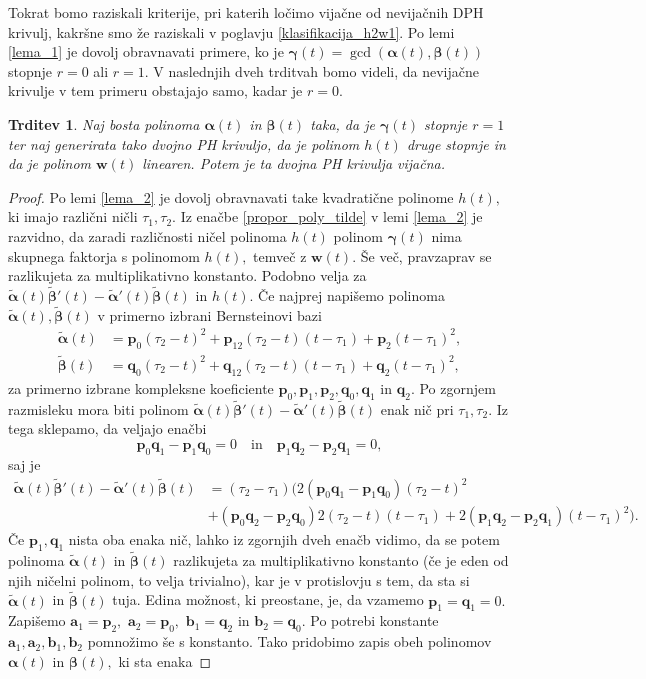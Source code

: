 \documentclass[12pt,a4paper,twoside]{article}
\theoremstyle{definition} %
\theoremstyle{plain} %
\newtheorem{trditev}[definicija]{Trditev}
\numberwithin{equation}{section}  %
\newcommand{\aV}{\mathbf{a}}
\newcommand{\bV}{\mathbf{b}}
\newcommand{\pV}{\mathbf{p}}
\newcommand{\qV}{\mathbf{q}}
\newcommand{\wV}{\mathbf{w}}
\newcommand{\balpha}{\boldsymbol \alpha}
\newcommand{\bbeta}{\boldsymbol \beta}
\newcommand{\bgamma}{\boldsymbol \gamma}
\newcommand{\btalpha}{\tilde{\boldsymbol \alpha}}
\newcommand{\btbeta}{\tilde{\boldsymbol \beta}}
\begin{document}
Tokrat bomo raziskali kriterije, pri katerih ločimo vijačne od nevijačnih DPH krivulj, kakršne smo že raziskali v poglavju \ref{klasifikacija_h2w1}. Po lemi \ref{lema_1} je dovolj obravnavati primere, ko je $\bgamma(t)=\gcd(\balpha(t),\bbeta(t))$ stopnje $r=0$ ali $r=1.$ V naslednjih dveh trditvah bomo videli, da nevijačne krivulje v tem primeru obstajajo samo, kadar je $r=0.$
\begin{trditev}
	Naj bosta polinoma $\balpha(t)$ in $\bbeta(t)$ taka, da je $\bgamma(t)$ stopnje $r=1$ ter naj generirata tako dvojno PH krivuljo, da je polinom $h(t)$ druge stopnje in da je polinom $\wV(t)$ linearen. Potem je ta dvojna PH krivulja vijačna.
\end{trditev}
\begin{proof}
	Po lemi \ref{lema_2} je dovolj obravnavati take kvadratične polinome $h(t),$ ki imajo različni ničli $\tau_1,\tau_2.$ Iz enačbe \eqref{propor_poly_tilde} v lemi \ref{lema_2} je razvidno, da zaradi različnosti ničel polinoma $h(t)$ polinom $\bgamma(t)$ nima skupnega faktorja s polinomom $h(t),$ temveč z $\wV(t).$ Še več, pravzaprav se razlikujeta za multiplikativno konstanto. Podobno velja za $\btalpha(t)\btbeta'(t)-\btalpha'(t)\btbeta(t)$ in $h(t).$ Če najprej napišemo polinoma $\btalpha(t),\btbeta(t)$ v primerno izbrani Bernsteinovi bazi
	\begin{align*}
		\btalpha(t)&=\pV_0(\tau_2-t)^2+\pV_12(\tau_2-t)(t-\tau_1)+\pV_2(t-\tau_1)^2,\\
		\btbeta(t)&=\qV_0(\tau_2-t)^2+\qV_12(\tau_2-t)(t-\tau_1)+\qV_2(t-\tau_1)^2,
	\end{align*}
	za primerno izbrane kompleksne koeficiente $\pV_0,\pV_1,\pV_2,\qV_0,\qV_1$ in $\qV_2.$ Po zgornjem razmisleku mora biti polinom $\btalpha(t)\btbeta'(t)-\btalpha'(t)\btbeta(t)$ enak nič pri $\tau_1,\tau_2.$ Iz tega sklepamo, da veljajo enačbi
	\begin{equation*}
		\pV_0\qV_1-\pV_1\qV_0=0\quad\text{in}\quad\pV_1\qV_2-\pV_2\qV_1=0,
	\end{equation*}
	saj je
	\begin{align*}
		\btalpha(t)\btbeta'(t)-\btalpha'(t)\btbeta(t)&=(\tau_2-\tau_1)\big(2(\pV_0\qV_1-\pV_1\qV_0)(\tau_2-t)^2\\
		&+(\pV_0\qV_2-\pV_2\qV_0)2(\tau_2-t)(t-\tau_1)
		+2(\pV_1\qV_2-\pV_2\qV_1)(t-\tau_1)^2\big).
	\end{align*}
	Če $\pV_1,\qV_1$ nista oba enaka nič, lahko iz zgornjih dveh enačb vidimo, da se potem polinoma $\btalpha(t)$ in $\btbeta(t)$ razlikujeta za multiplikativno konstanto (če je eden od njih ničelni polinom, to velja trivialno), kar je v protislovju s tem, da sta si $\btalpha(t)$ in $\btbeta(t)$ tuja. Edina možnost, ki preostane, je, da vzamemo $\pV_1=\qV_1=0.$ Zapišemo $\aV_1=\pV_2,$ $\aV_2=\pV_0,$ $\bV_1=\qV_2$ in $\bV_2=\qV_0.$ Po potrebi konstante $\aV_1,\aV_2,\bV_1,\bV_2$ pomnožimo še s konstanto. Tako pridobimo zapis obeh polinomov $\balpha(t)$ in $\bbeta(t),$ ki sta enaka

\end{proof}
\end{document}
